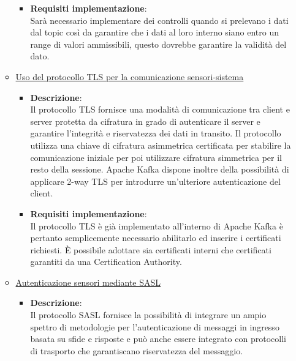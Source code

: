 \documentclass[10pt]{article}
\begin{document}
\begin{itemize}
\begin{itemize}
\begin{itemize}
                    \item \textbf{Requisiti implementazione}:\\
                    Sarà necessario implementare dei controlli quando si prelevano i dati dal topic così da garantire che i dati al loro interno siano entro un range di valori ammissibili, questo dovrebbe garantire la validità del dato.

                \end{itemize}

                \item \underline{Uso del protocollo TLS per la comunicazione sensori-sistema}
                \begin{itemize}
                    \item \textbf{Descrizione}:\\
                    Il protocollo TLS fornisce una modalità di comunicazione tra client e server protetta da cifratura
                    in grado di autenticare il server e garantire l'integrità e riservatezza dei dati in transito.
                    Il protocollo utilizza una chiave di cifratura asimmetrica certificata per stabilire la comunicazione iniziale
                    per poi utilizzare cifratura simmetrica per il resto della sessione.
                    Apache Kafka dispone inoltre della possibilità di applicare 2-way TLS per introdurre un'ulteriore autenticazione del client.
                    
                    \item \textbf{Requisiti implementazione}:\\
                    Il protocollo TLS è già implementato all'interno di Apache Kafka è pertanto semplicemente necessario abilitarlo ed inserire i certificati richiesti.
                    È possibile adottare sia certificati interni che certificati garantiti da una Certification Authority.
                    
                \end{itemize}
                
                \item \underline{Autenticazione sensori mediante SASL}
                \begin{itemize}
                    \item \textbf{Descrizione}:\\
                    Il protocollo SASL fornisce la possibilità di integrare un ampio spettro di metodologie per l'autenticazione di messaggi in ingresso basata su sfide e risposte e può anche essere integrato con
                    protocolli di trasporto che garantiscano riservatezza del messaggio.
                    

\end{itemize}
\end{itemize}
\end{itemize}
\end{document}
